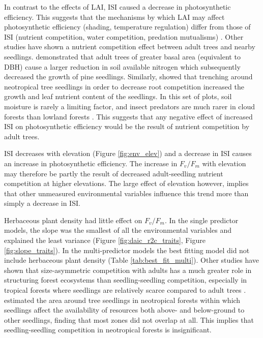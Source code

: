 \documentclass[a4paper,11pt]{article}
\begin{document}
In contrast to the effects of LAI, ISI caused a decrease in photosynthetic efficiency. This suggests that the mechanisms by which LAI may affect photosynthetic efficiency (shading, temperature regulation) differ from those of ISI (nutrient competition, water competition, predation mutualisms) \citep{Lewis2000}. Other studies have shown a nutrient competition effect between adult trees and nearby seedlings. \citet{Palik1997} demonstrated that adult trees of greater basal area (equivalent to DBH) cause a larger reduction in soil available nitrogen which subsequently decreased the growth of pine seedlings. Similarly, \citet{Barberis2005} showed that trenching around neotropical tree seedlings in order to decrease root competition increased the growth and leaf nutrient content of the seedlings. In this set of plots, soil moisture is rarely a limiting factor, and insect predators are much rarer in cloud forests than lowland forests \citep{Rodriguez-Castaeda2010}. This suggests that any negative effect of increased ISI on photosynthetic efficiency would be the result of nutrient competition by adult trees.

ISI decreases with elevation (Figure \ref{fig:env_elev}) and a decrease in ISI causes an increase in photosynthetic efficiency. The increase in $F_v/F_m$ with elevation may therefore be partly the result of decreased adult-seedling nutrient competition at higher elevations. The large effect of elevation however, implies that other unmeasured environmental variables influence this trend more than simply  a decrease in ISI.

Herbaceous plant density had little effect on $F_v/F_m$. In the single predictor models, the slope was the smallest of all the environmental variables and explained the least variance (Figure \ref{fig:daic_r2c_traits}, Figure \ref{fig:slope_traits}). In the multi-predictor models the best fitting model did not include herbaceous plant density (Table \ref{tab:best_fit_multi}). Other studies have shown that size-asymmetric competition with adults has a much greater role in structuring forest ecosystems than seedling-seedling competition, especially in tropical forests where seedlings are relatively scarce compared to adult trees \citep{Moles2004, Powers2004}. \citet{Paine2008} estimated the area around tree seedlings in neotropical forests within which seedlings affect the availability of resources both above- and below-ground to other seedlings, finding that most zones did not overlap at all. This implies that seedling-seedling competition in neotropical forests is insignificant. 
\end{document}
